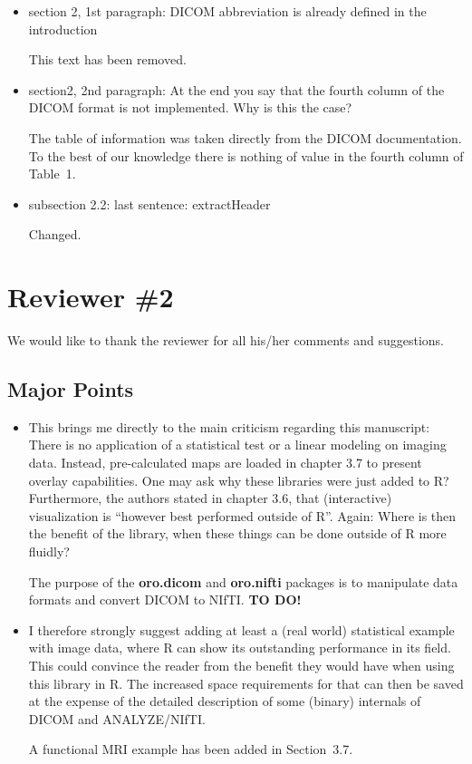 \documentclass[11pt]{article}
\begin{document}
\begin{itemize} 

\item section 2, 1st paragraph: DICOM abbreviation is already defined
  in the introduction

  This text has been removed.

\item section2, 2nd paragraph: At the end you say that the fourth
  column of the DICOM format is not implemented. Why is this the case?

  The table of information was taken directly from the DICOM
  documentation.  To the best of our knowledge there is nothing of
  value in the fourth column of Table~1.

\item subsection 2.2: last sentence: extractHeader

  Changed.

\end{itemize}

\section*{Reviewer \#2}

We would like to thank the reviewer for all his/her comments and
suggestions.

\subsection*{Major Points}

\begin{itemize}

\item This brings me directly to the main criticism regarding this
  manuscript: There is no application of a statistical test or a
  linear modeling on imaging data.  Instead, pre-calculated maps are
  loaded in chapter 3.7 to present overlay capabilities.  One may ask
  why these libraries were just added to R?  Furthermore, the authors
  stated in chapter 3.6, that (interactive) visualization is ``however
  best performed outside of R''.  Again: Where is then the benefit of
  the library, when these things can be done outside of R more
  fluidly?

  The purpose of the \textbf{oro.dicom} and \textbf{oro.nifti}
  packages is to manipulate data formats and convert DICOM to NIfTI.
  \textbf{TO DO!}

\item I therefore strongly suggest adding at least a (real world)
  statistical example with image data, where R can show its
  outstanding performance in its field.  This could convince the
  reader from the benefit they would have when using this library in
  R.  The increased space requirements for that can then be saved at
  the expense of the detailed description of some (binary) internals
  of DICOM and ANALYZE/NIfTI.

  A functional MRI example has been added in Section~3.7.

\end{itemize}
\end{document}
